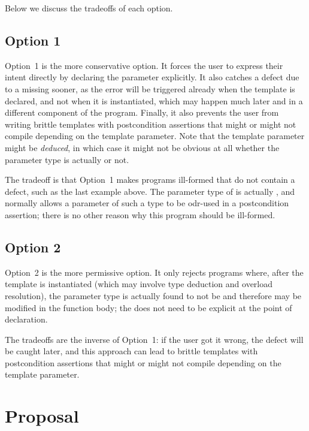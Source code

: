 Below we discuss the tradeoffs of each option.

\subsection*{Option 1}

Option~1 is the more conservative option. It forces the user to express their intent directly by  declaring the parameter  explicitly. It also catches a defect due to a missing  sooner, as the error will be triggered already when the template is declared, and not when it is instantiated, which may happen much later and in a different component of the program. Finally, it also prevents the user from writing brittle templates with postcondition assertions that might or might not compile depending on the template parameter. Note that the template parameter might be \emph{deduced}, in which case it might not be obvious at all whether the parameter type is actually  or not.

The tradeoff is that Option~1 makes programs ill-formed that do not contain a defect, such as the last example above. The parameter type of  is actually , and \cite{P2900R10} normally allows a parameter of such a type to be odr-used in a postcondition assertion; there is no other reason why this program should be ill-formed.

\subsection*{Option 2}

Option~2 is the more permissive option. It only rejects programs where, after the template is instantiated (which may involve type deduction and overload resolution), the parameter type is actually found to not be  and therefore may be modified in the function body; the  does not need to be explicit at the point of declaration. 

The tradeoffs are the inverse of Option~1: if the user got it wrong, the defect will be caught later, and this approach can lead to brittle templates with postcondition assertions that might or might not compile depending on the template parameter.

\section{Proposal}

